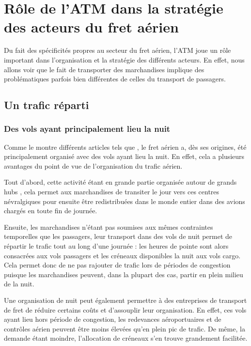 \section{Rôle de l'ATM dans la stratégie des acteurs du fret aérien}


Du fait des spécificités propres au secteur du fret aérien, l'ATM joue un rôle important dans l'organisation et la stratégie des différents acteurs. En effet, nous allons voir que le fait de transporter des marchandises implique des problématiques parfois bien différentes de celles du transport de passagers.

\subsection{Un trafic réparti}

\subsubsection{Des vols ayant principalement lieu la nuit}

Comme le montre différents articles tels que \cite{popescu}, le fret aérien a, dès ses origines, été principalement organisé avec des vols ayant lieu la nuit. En effet, cela a plusieurs avantages du point de vue de l'organisation du trafic aérien. 

Tout d'abord, cette activité étant en grande partie organisée autour de grands hubs \cite{Walcott201764}, cela permet aux marchandises de transiter le jour vers ces centres névralgiques pour ensuite être redistribuées dans le monde entier dans des avions chargés en toute fin de journée. 

Ensuite, les marchandises n'étant pas soumises aux mêmes contraintes temporelles que les passagers, leur transport dans des vols de nuit permet de répartir le trafic tout au long d'une journée : les heures de pointe sont alors consacrées aux vols passagers et les créneaux disponibles la nuit aux vols cargo. Cela permet donc de ne pas rajouter de trafic lors de périodes de congestion puisque les marchandises peuvent, dans la plupart des cas, partir en plein milieu de la nuit.

Une organisation de nuit peut également permettre à des entreprises de transport de fret de réduire certains coûts et d'assouplir leur organisation. En effet, ces vols ayant lieu hors période de congestion, les redevances aéroportuaires et de contrôles aérien peuvent être moins élevées qu'en plein pic de trafic. De même, la demande étant moindre, l'allocation de créneaux s'en trouve grandement facilitée.

